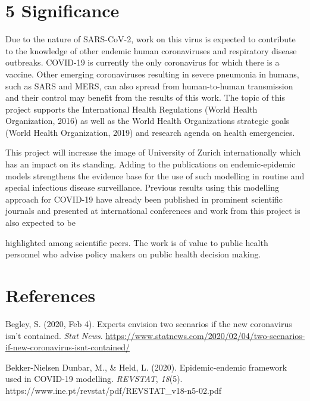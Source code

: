 \documentclass[authordate, rga]{jote-new-article}
\begin{document}
\section{5 Significance}



Due to the nature of SARS-CoV-2, work on this virus is expected to contribute to the knowledge of other endemic human coronaviruses and respiratory disease outbreaks. COVID-19 is currently the only coronavirus for which there is a vaccine. Other emerging coronaviruses resulting in severe pneumonia in humans, such as SARS and MERS, can also spread from human-to-human transmission and their control may benefit from the results of this work. The topic of this project supports the International Health Regulations (World Health Organization, 2016) as well as the World Health Organizations strategic goals (World Health Organization, 2019) and research agenda on health emergencies.







This project will increase the image of University of Zurich internationally which has an impact on its standing. Adding to the publications on endemic-epidemic models strengthens the evidence base for the use of such modelling in routine and special infectious disease surveillance. Previous results using this modelling approach for COVID-19 have already been published in prominent scientific journals and presented at international conferences and work from this project is also expected to be



highlighted among scientific peers. The work is of value to public health personnel who advise policy makers on public health decision making.



\newpage
\section{References}

\hspace*{\parindent}Begley, S. (2020, Feb 4). Experts envision two scenarios if the new coronavirus isn't contained. \emph{Stat News}. \url{https://www.statnews.com/2020/02/04/two-scenarios-if-new-coronavirus-isnt-contained/}


Bekker-Nielsen Dunbar, M., \& Held, L. (2020). Epidemic-endemic framework used in COVID-19 modelling. \emph{REVSTAT}, \emph{18}(5). https://www.ine.pt/revstat/pdf/REVSTAT\_v18-n5-02.pdf
\end{document}
